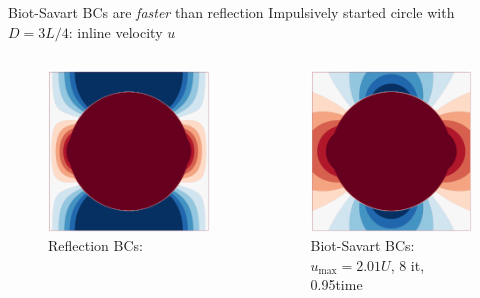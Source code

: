 \documentclass[aspectratio=169,small]{beamer}
\begin{document}
\begin{frame}[fragile]{Biot-Savart BCs are \textit{faster} than reflection} %
    \small{Impulsively started circle with $D=3L/4$: inline velocity $u$}    
    \begin{columns}[onlytextwidth]
        \begin{column}{.5\textwidth}
        \begin{figure}
            \centering
            \includegraphics[height=0.6\textwidth]{fig/reflection_tight.png}
            \caption*{Reflection BCs: \\ }
        \end{figure}
        \end{column}
        \begin{column}{.5\textwidth}
        \begin{figure}
            \centering
            \includegraphics[height=0.6\textwidth]{fig/biotBC.png}
            \caption*{Biot-Savart BCs: \\ \color{teal} {$u_\text{max}=2.01U$, 8 it, 0.95time}}
        \end{figure}
        \end{column}
    \end{columns}
\end{frame}
\end{document}
